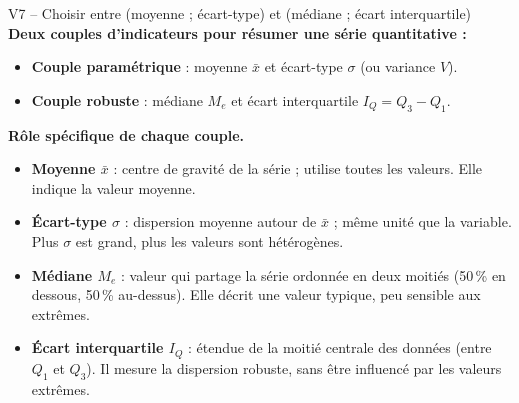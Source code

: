 \documentclass[11pt,a4paper]{article}
\begin{document}
\begin{vignetteCours}{V7 -- Choisir entre (moyenne ; écart-type) et (médiane ; écart interquartile)}
\textbf{Deux couples d'indicateurs pour résumer une série quantitative :}
\begin{itemize}[leftmargin=*,itemsep=1pt]
  \item \textbf{Couple paramétrique} : moyenne $\bar{x}$ et écart-type $\sigma$ (ou variance $V$).
  \item \textbf{Couple robuste} : médiane $M_e$ et écart interquartile $I_Q = Q_3 - Q_1$.
\end{itemize}

\medskip
\textbf{Rôle spécifique de chaque couple.}
\begin{itemize}[leftmargin=*,itemsep=1pt]
  \item \textbf{Moyenne $\bar{x}$} : centre de gravité de la série ; utilise toutes les valeurs. Elle indique la valeur moyenne.
  \item \textbf{Écart-type $\sigma$} : dispersion moyenne autour de $\bar{x}$ ; même unité que la variable. Plus $\sigma$ est grand, plus les valeurs sont hétérogènes.
  \item \textbf{Médiane $M_e$} : valeur qui partage la série ordonnée en deux moitiés (50\,\% en dessous, 50\,\% au-dessus). Elle décrit une valeur typique, peu sensible aux extrêmes.
  \item \textbf{Écart interquartile $I_Q$} : étendue de la moitié centrale des données (entre $Q_1$ et $Q_3$). Il mesure la dispersion robuste, sans être influencé par les valeurs extrêmes.
\end{itemize}


\end{vignetteCours}
\end{document}
